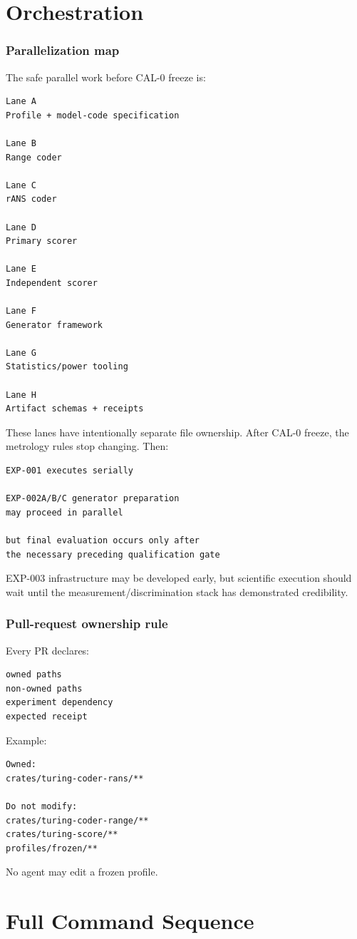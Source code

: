 \documentclass[11pt]{article}
\begin{document}
\part{Orchestration}

\section{Parallelization map}

The safe parallel work before CAL-0 freeze is:
\begin{verbatim}
Lane A
Profile + model-code specification

Lane B
Range coder

Lane C
rANS coder

Lane D
Primary scorer

Lane E
Independent scorer

Lane F
Generator framework

Lane G
Statistics/power tooling

Lane H
Artifact schemas + receipts
\end{verbatim}
These lanes have intentionally separate file ownership. After CAL-0 freeze, the metrology rules stop changing. Then:
\begin{verbatim}
EXP-001 executes serially

EXP-002A/B/C generator preparation
may proceed in parallel

but final evaluation occurs only after
the necessary preceding qualification gate
\end{verbatim}
EXP-003 infrastructure may be developed early, but scientific execution should wait until the measurement/discrimination stack has demonstrated credibility.

\section{Pull-request ownership rule}

Every PR declares:
\begin{verbatim}
owned paths
non-owned paths
experiment dependency
expected receipt
\end{verbatim}
Example:
\begin{verbatim}
Owned:
crates/turing-coder-rans/**

Do not modify:
crates/turing-coder-range/**
crates/turing-score/**
profiles/frozen/**
\end{verbatim}
No agent may edit a frozen profile.

\part{Full Command Sequence}
\end{document}
